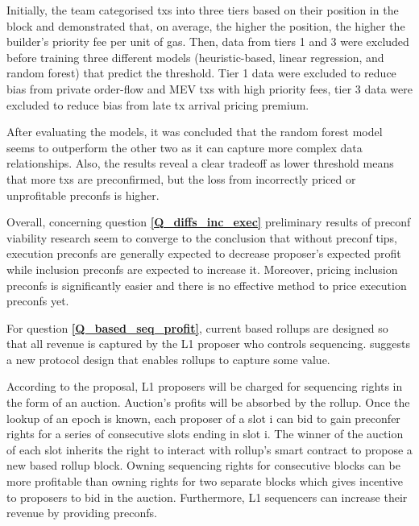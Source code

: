 \documentclass[a4paper]{article}
\theoremstyle{boldstyle}
\begin{document}
    Initially, the team categorised txs into three tiers based on their position in the block and demonstrated that, on average, the higher the position, the higher the builder's priority fee per unit of gas. Then, data from tiers 1 and 3 were excluded before training three different models (heuristic-based, linear regression, and random forest) that predict the threshold. Tier 1 data were excluded to reduce bias from private order-flow and MEV txs with high priority fees, tier 3 data were excluded to reduce bias from late tx arrival pricing premium.

    After evaluating the models, it was concluded that the random forest model seems to outperform the other two as it can capture more complex data relationships. Also, the results reveal a clear tradeoff as lower threshold means that more txs are preconfirmed, but the loss from incorrectly priced or unprofitable preconfs is higher.

    Overall, concerning question \textbf{\ref{Q_diffs_inc_exec}} preliminary results of preconf viability research seem to converge to the conclusion that without preconf tips, execution preconfs are generally expected to decrease proposer's expected profit while inclusion preconfs are expected to increase it. Moreover, pricing inclusion preconfs is significantly easier and there is no effective method to price execution preconfs yet.

    For question \textbf{\ref{Q_based_seq_profit}}, current based rollups are designed so that all revenue is captured by the L1 proposer who controls sequencing. \cite{W:Value-CapturingBasedRollupswithBasedPreconfirmations} suggests a new protocol design that enables rollups to capture some value.

    According to the proposal, L1 proposers will be charged for sequencing rights in the form of an auction. Auction's profits will be absorbed by the rollup. Once the lookup of an epoch is known, each proposer of a slot i can bid to gain preconfer rights for a series of consecutive slots ending in slot i. The winner of the auction of each slot inherits the right to interact with rollup's smart contract to propose a new based rollup block. Owning sequencing rights for consecutive blocks can be more profitable than owning rights for two separate blocks which gives incentive to proposers to bid in the auction. Furthermore, L1 sequencers can increase their revenue by providing preconfs.
\end{document}
